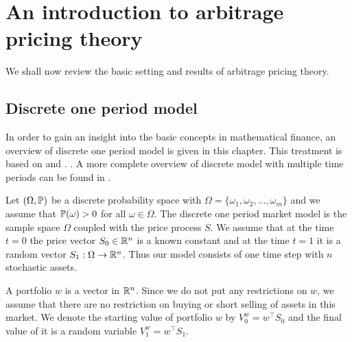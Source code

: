\chapter{An introduction to arbitrage pricing theory}
\label{chap:arbitrage}

We shall now review the basic setting and results of arbitrage pricing theory.

\section{Discrete one period model}

In order to gain an insight into the basic concepts in mathematical finance, an overview of discrete one period model is given in this chapter. This treatment is based on \textcite[pp. 5--34]{bjork2004arbitrage} and \textcite[pp. 3--12]{duffie2010dynamic}. . A more complete overview of discrete model with multiple time periods can be found in \textcite[pp. 33--85]{musielarutkowski2005martingale}.

Let $(\Omega, \mathbb{P})$ be a discrete probability space with $\Omega = \{ \omega_1, \omega_2, \ldots , \omega_m \}$ and we assume that $\mathbb{P} (\omega ) > 0$ for all $\omega \in \Omega$. The discrete one period market model is the sample space $\Omega$ coupled with the price process $S$. We assume that at the time $t=0$ the price vector $S_0 \in \mathbb{R}^n$ is a known constant and at the time $t=1$ it is a random vector $S_1 : \Omega \rightarrow \mathbb{R}^n$. Thus our model consists of one time step with $n$ stochastic assets. 

A portfolio $w$ is a vector in $\mathbb{R}^n$. Since we do not put any restrictions on $w$, we assume that there are no restriction on buying or short selling of assets in this market. We denote the starting value of portfolio $w$ by $V_0^w = w^{\top} S_0$ and the final value of it is a random variable $V_1^w = w^{\top} S_1$. 

